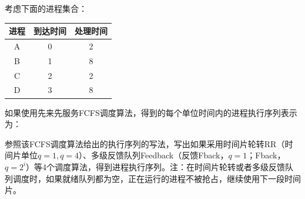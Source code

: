 \begin{problem}
考虑下面的进程集合：
\begin{table}[H]
    \vspace{-0.5em}
    \centering
    \begin{tabular}{|c|c|c|}
    \hline
    进程& 到达时间& 处理时间\\ \hline
    A & 0   & 2   \\ \hline
    B & 1   & 8   \\ \hline
    C & 2   & 2   \\ \hline
    D & 3   & 8   \\ \hline
    \end{tabular}
    \vspace{-1.5em}
\end{table}
如果使用先来先服务FCFS调度算法，得到的每个单位时间内的进程执行序列表示为：
\begin{table}[H]
    \vspace{-0.5em}
    \centering
    \vspace{-1.5em}
\end{table}
参照该FCFS调度算法给出的执行序列的写法，写出如果采用时间片轮转RR（时间片单位$q=1, q=4$）、多级反馈队列Feedback（反馈Fback，$q=1$；Fback，$q=2^i$）等4个调度算法，得到进程执行序列。注：在时间片轮转或者多级反馈队列调度时，如果就绪队列都为空，正在运行的进程不被抢占，继续使用下一段时间片。

\end{problem}

